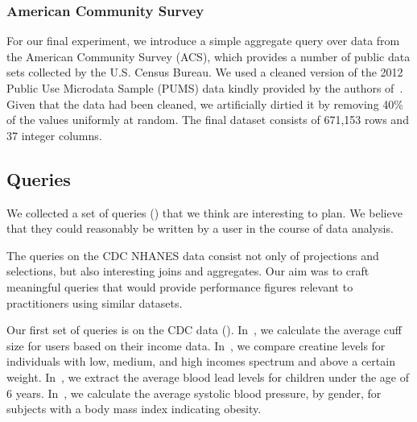\subsubsection{American Community Survey}
For our final experiment, we introduce a simple aggregate query over data from the American Community Survey (ACS), which
provides a number of public data sets collected by the U.S. Census Bureau.
We used a cleaned version of the 2012 Public Use Microdata Sample (PUMS) data kindly provided by the authors of~\cite{akande2015empirical}.
Given that the data had been cleaned, we artificially dirtied it by removing 40\% of the values uniformly at random.
The final dataset consists of 671,153 rows and 37 integer columns.

\subsection{Queries}
We collected a set of queries () that we think are interesting to plan.
We believe that they could reasonably be written by a user in the course of data analysis.

The queries on the CDC NHANES data consist not only of projections and selections, but also interesting joins and aggregates.
Our aim was to craft meaningful queries
that would provide performance figures relevant to practitioners using
similar datasets.

Our first set of queries is on the CDC data (). In~, we
calculate the average cuff size for users based on their income data. In~, we compare
creatine levels for individuals with low, medium, and high incomes spectrum and above a
certain weight. In~, we extract the average blood lead levels for children under
the age of 6 years. In~, we calculate the average systolic blood pressure, by
gender, for subjects with a body mass index indicating obesity. 

